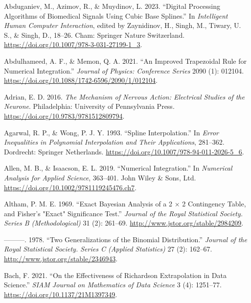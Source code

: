 \documentclass[
]{article}
\author{}
\date{}
\newlength{\cslhangindent}
\newlength{\cslentryspacingunit} %
\newenvironment{CSLReferences}[2] %
 {%
  \setlength{\parindent}{0pt}
  \ifodd #1
  \let\oldpar\par
  \def\par{\hangindent=\cslhangindent\oldpar}
  \fi
  \setlength{\parskip}{#2\cslentryspacingunit}
 }%
 {}
\begin{document}
\hypertarget{refs}{}
\begin{CSLReferences}{1}{0}
\leavevmode{}%
Abduganiev, M., Azimov, R., \& Muydinov, L. 2023. {``Digital Processing
Algorithms of Biomedical Signals Using Cubic Base Splines.''} In
\emph{Intelligent Human Computer Interaction}, edited by Zaynidinov, H.,
Singh, M., Tiwary, U. S., \& Singh, D., 18--26. Cham: Springer Nature
Switzerland. \url{https://doi.org/10.1007/978-3-031-27199-1_3}.

\leavevmode{}%
Abdulhameed, A. F., \& Memon, Q. A. 2021. {``An Improved Trapezoidal
Rule for Numerical Integration.''} \emph{Journal of Physics: Conference
Series} 2090 (1): 012104.
\url{https://doi.org/10.1088/1742-6596/2090/1/012104}.

\leavevmode{}%
Adrian, E. D. 2016. \emph{The Mechanism of Nervous Action: Electrical
Studies of the Neurone}. Philadelphia: University of Pennsylvania Press.
\url{https://doi.org/10.9783/9781512809794}.

\leavevmode{}%
Agarwal, R. P., \& Wong, P. J. Y. 1993. {``Spline Interpolation.''} In
\emph{Error Inequalities in Polynomial Interpolation and Their
Applications}, 281--362. Dordrecht: Springer Netherlands.
\url{https://doi.org/10.1007/978-94-011-2026-5_6}.

\leavevmode{}%
Allen, M. B., \& Isaacson, E. L. 2019. {``Numerical Integration.''} In
\emph{Numerical Analysis for Applied Science}, 363--401. John Wiley \&
Sons, Ltd. \url{https://doi.org/10.1002/9781119245476.ch7}.

\leavevmode{}%
Altham, P. M. E. 1969. {``Exact Bayesian Analysis of a 2 × 2 Contingency
Table, and Fisher's "Exact" Significance Test.''} \emph{Journal of the
Royal Statistical Society. Series B (Methodological)} 31 (2): 261--69.
\url{http://www.jstor.org/stable/2984209}.

\leavevmode{}%
---------. 1978. {``Two Generalizations of the Binomial Distribution.''}
\emph{Journal of the Royal Statistical Society. Series C (Applied
Statistics)} 27 (2): 162--67. \url{http://www.jstor.org/stable/2346943}.

\leavevmode{}%
Bach, F. 2021. {``On the Effectiveness of Richardson Extrapolation in
Data Science.''} \emph{SIAM Journal on Mathematics of Data Science} 3
(4): 1251--77. \url{https://doi.org/10.1137/21M1397349}.


\end{CSLReferences}
\end{document}

